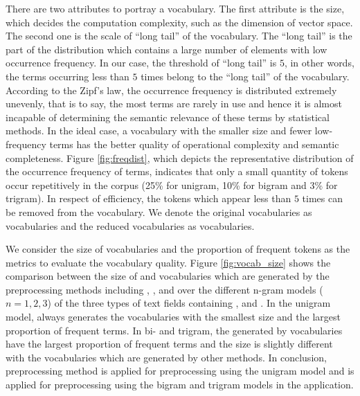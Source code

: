 There are two attributes to portray a vocabulary. The first attribute is the size, which decides the computation complexity, such as the dimension of vector space. The second one is the scale of ``long tail'' of the vocabulary. The ``long tail'' is the part of the distribution which contains a large number of elements with low occurrence frequency. In our case, the threshold of ``long tail'' is $5$, in other words, the terms occurring less than $5$ times belong to the ``long tail'' of the vocabulary. According to the Zipf's law, the occurrence frequency is distributed extremely unevenly, that is to say, the most terms are rarely in use and hence it is almost incapable of determining the semantic relevance of these terms by statistical methods. In the ideal case, a vocabulary with the smaller size and fewer low-frequency terms has the better quality of operational complexity and semantic completeness. Figure \ref{fig:freqdist}, which depicts the representative distribution of the occurrence frequency of terms, indicates that only a small quantity of tokens occur repetitively in the corpus (25\% for unigram, 10\% for bigram and 3\% for trigram). In respect of efficiency, the tokens which appear less than $5$ times can be removed from the vocabulary. We denote the original vocabularies as \ifull{} vocabularies and the reduced vocabularies as \icommon{} vocabularies. 



We consider the size of \ifull{} vocabularies and the proportion of frequent tokens as the metrics to evaluate the vocabulary quality. Figure \ref{fig:vocab_size} shows the comparison between the size of \ifull{} and \icommon{} vocabularies which are generated by the preprocessing methods including \iSP{}, \iSE{}, \iST{} and \iSS{} over the different n-gram models ($n=1, 2, 3$) of the three types of text fields containing \icontent{}, \ititle{} and \isummary{}. In the unigram model, \iSS{} always generates the vocabularies with the smallest size and the largest proportion of frequent terms. In bi- and trigram, the generated by \iSE{} vocabularies have the largest proportion of frequent terms and the size is slightly different with the vocabularies which are generated by other methods. In conclusion, preprocessing method \iSS{} is applied for preprocessing using the unigram model and \iSE{} is applied for preprocessing using the bigram and trigram models in the application. 



